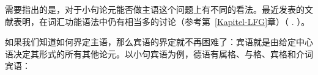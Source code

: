 
需要指出的是，对于小句论元能否做主语这个问题上有不同的看法。最近发表的文献表明，在词汇功能语法中仍有相当多的讨论（参考第~\ref{Kapitel-LFG}章）（ \citep*{DL2000a-u,Berman2003a-u,Berman2007a-u,AMM2005a-u,Forst2006a-u}. ）。

如果我们知道如何界定主语，那么宾语的界定就不再困难了：宾语就是由给定中心语决定其形式的所有其他论元。以小句宾语为例，德语有属格、与格、宾格和介词宾语：

